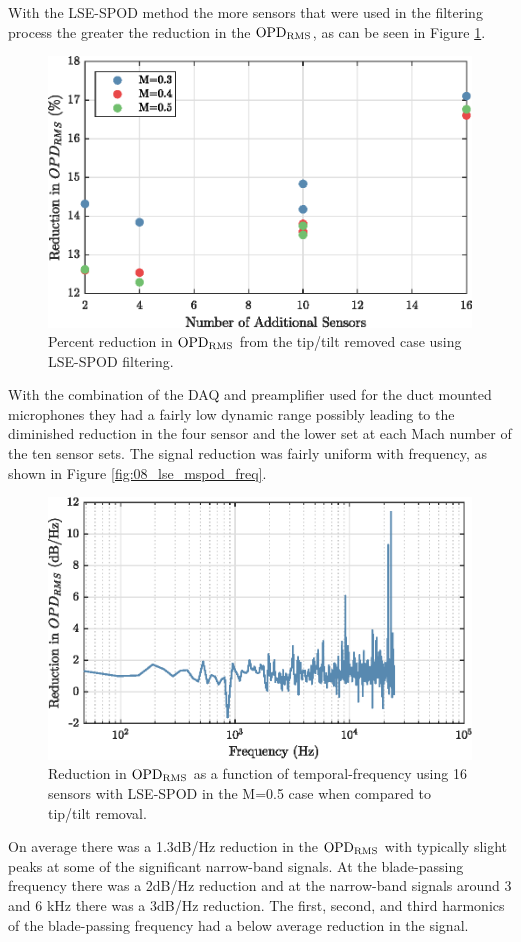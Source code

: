 With the LSE-SPOD method the more sensors that were used in the filtering process the greater the reduction in the $\operatorname{OPD_{RMS}}$, as can be seen in Figure \ref{fig:08_lse_summary}.
\begin{figure}
  \centering
  \includegraphics{../matlab/08_conclusion/lse_summary.eps}
  \caption{Percent reduction in $\operatorname{OPD_{RMS}}$ from the tip/tilt removed case using LSE-SPOD filtering.}
  \label{fig:08_lse_summary}
\end{figure}
With the combination of the DAQ and preamplifier used for the duct mounted microphones they had a fairly low dynamic range possibly leading to the diminished reduction in the four sensor and the lower set at each Mach number of the ten sensor sets.
The signal reduction was fairly uniform with frequency, as shown in Figure \ref{fig:08_lse_mspod_freq}.
\begin{figure}
  \centering
  \includegraphics{../matlab/07_multiple_sensor_filtering/lse_mspod_freq.eps}
  \caption{Reduction in $\operatorname{OPD_{RMS}}$ as a function of temporal-frequency using 16 sensors with LSE-SPOD in the M=0.5 case when compared to tip/tilt removal.}
\end{figure}
On average there was a 1.3dB/Hz reduction in the $\operatorname{OPD_{RMS}}$ with typically slight peaks at some of the significant narrow-band signals.
At the blade-passing frequency there was a 2dB/Hz reduction and at the narrow-band signals around 3 and 6 kHz there was a 3dB/Hz reduction.
The first, second, and third harmonics of the blade-passing frequency had a below average reduction in the signal.

